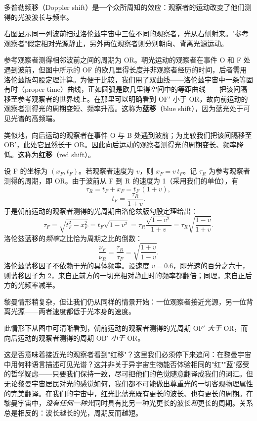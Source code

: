 
多普勒频移（Doppler shift）是一个众所周知的效应：观察者的运动改变了他们测得的光波波长与频率。

右图显示同一列波前扫过洛伦兹宇宙中三位不同的观察者，光从右侧射来。"参考观察者"假定相对光源静止，另外两位观察者则分别朝向、背离光源运动。

参考观察者测得相邻波前之间的周期为 OR。朝光运动的观察者在事件 O 和 F 处遇到波前，但图中所示的 OF 的欧几里得长度并非观察者经历的时间，后者需用洛伦兹版勾股定理计算。为便于比较，我们用了双曲线——洛伦兹宇宙中一条等固有时（proper time）曲线，正如圆弧是欧几里得空间中的等距曲线——把该间隔移至参考观察者的世界线上。在那里可以明确看到 $\mathrm{OF}'$ 小于 OR，故向前运动的观察者测得光的周期变短、频率升高。这称为\textbf{蓝移}（blue shift），因为蓝光处于可见光谱的高频端。

类似地，向后运动的观察者在事件 O 与 B 处遇到波前；为比较我们把该间隔移至 $\mathrm{OB}'$，此处它显然长于 OR。因此向后运动的观察者测得光的周期变长、频率降低。这称为\textbf{红移}（red shift）。

设 F 的坐标为 $(x_F, t_F)$。若观察者速度为 $v$，则 $x_F = v\,t_F$。记 $\tau_R$ 为参考观察者测得的周期，即 OR。由于波前从 F 到 R 的速度为 1（采用我们的单位），有
\[
\tau_R = t_F + x_F = t_F\,(1+v),
\]
\[
t_F = \frac{\tau_R}{1+v}.
\]
于是朝前运动的观察者测得的光周期由洛伦兹版勾股定理给出：
\[
\tau_F = \sqrt{t_F^{2} - x_F^{2}}
       = t_F\sqrt{1 - v^{2}}
       = \tau_R\frac{\sqrt{1 - v^{2}}}{1+v}
       = \tau_R\sqrt{\frac{1 - v}{1+v}}.
\]
洛伦兹蓝移的\emph{频率}之比恰为周期之比的倒数：
\[
\frac{\nu_F}{\nu_R} = \frac{\tau_R}{\tau_F} = \sqrt{\frac{1+v}{1-v}}.
\]
洛伦兹蓝移因子不依赖于光的具体频率。设速度 $v = 0.6$，即光速的百分之六十，则蓝移因子为 2，来自正前方的一切光相对静止时的频率都翻倍；同理，来自正后方的光频率减半。

黎曼情形稍复杂，但让我们仍从同样的情景开始：一位观察者接近光源，另一位背离光源——两者速度都低于光本身的速度。


此情形下从图中可清晰看到，朝前运动的观察者测得的光周期 $\mathrm{OF}'$ \emph{大于} OR，而向后运动的观察者测得的周期 $\mathrm{OB}'$ \emph{小于} OR。

这是否意味着接近光的观察者看到"红移"？这里我们必须停下来追问：在黎曼宇宙中用何种语言描述可见光谱？这并非关于异宇宙生物能否体验相同的"红""蓝"感受的哲学疑虑——只要我们保持一致，尽可把他们的色觉随意翻译成我们的词汇。但无论黎曼宇宙居民对光的感觉如何，我们都不可能做出尊重光的一切客观物理属性的完美翻译。在我们的宇宙中，红光比蓝光既有更长的波长、也有更长的周期。在黎曼宇宙中，\emph{没有任何一种光}同时具有比另一种光更长的波长\emph{和}更长的周期。关系总是相反的：波长越长的光，周期反而越短。

